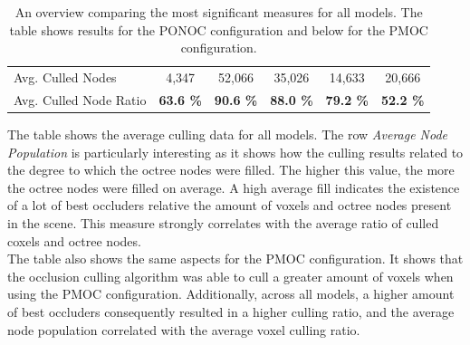 \begin{table}[!htb]
\begin{tabular}{|lccccc|}
    \multicolumn{1}{|l|}{Avg. Culled Nodes}         & \multicolumn{1}{c|}{4,347}                    & \multicolumn{1}{c|}{52,066}                   & \multicolumn{1}{c|}{35,026}           & \multicolumn{1}{c|}{14,633}               & \multicolumn{1}{c|}{20,666}               \\
    \multicolumn{1}{|l|}{Avg. Culled Node Ratio}    & \multicolumn{1}{c|}{\textbf{63.6 \%}}         & \multicolumn{1}{c|}{\textbf{90.6 \%}}         & \multicolumn{1}{c|}{\textbf{88.0 \%}} & \multicolumn{1}{c|}{\textbf{79.2 \%}}     & \multicolumn{1}{c|}{\textbf{52.2 \%}}     \\ \hline
    
  \end{tabular}
  \caption{An overview comparing the most significant measures for all models. 
  The table shows results for the \ac{PONOC} configuration and below for the 
  \ac{PMOC} configuration.}
  \label{tbl:culling-result-overview}
\end{table}
  
\noindent
The table shows the average culling data for all models. The row \emph{Average Node Population} is 
particularly interesting as it shows how the culling results related to the degree to which the octree 
nodes were filled. The higher this value, the more the octree nodes were filled on average. A high 
average fill indicates the existence of a lot of best occluders relative the amount of voxels and 
octree nodes present in the scene. This measure strongly correlates with the average ratio of culled 
coxels and octree nodes. \\

\noindent
The table also shows the same aspects for the \ac{PMOC} configuration. It shows that the 
occlusion culling algorithm was able to cull a greater amount of voxels when using the \ac{PMOC} 
configuration. Additionally, across all models, a higher amount of best occluders consequently resulted in a 
higher culling ratio, and the average node population correlated with the average voxel culling ratio.

